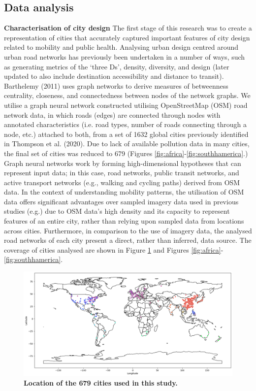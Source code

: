 \documentclass[preprint,12pt]{elsarticle}
\begin{document}
\subsection*{Data analysis}
\textbf{Characterisation of city design}
The first stage of this research was to create a representation of cities that accurately captured important features of city design related to mobility and public health. Analysing urban design centred around urban road networks has previously been undertaken in a number of ways, such as generating metrics of the `three Ds'\cite{Ewing2010}, density, diversity, and design (later updated to also include destination accessibility and distance to transit). Barthelemy (2011)\cite{Barthelemy2011} uses graph networks to derive measures of betweenness centrality, closeness, and connectedness between nodes of the network graphs. We utilise a graph neural network constructed utilising OpenStreetMap (OSM) road network data\cite{Boeing2017a}, in which roads (edges) are connected through nodes with annotated characteristics (i.e. road types, number of roads connecting through a node, etc.) attached to both, from a set of 1632 global cities previously identified in Thompson et al. (2020)\cite{Thompson2020}. Due to lack of available pollution data in many cities, the final set of cities was reduced to 679 (Figures \ref{fig:africa}-\ref{fig:southhamerica}.) Graph neural networks work by forming high-dimensional hypotheses that can represent input data; in this case, road networks, public transit networks, and active transport networks (e.g., walking and cycling paths) derived from OSM data. In the context of understanding mobility patterns, the utilisation of OSM data offers significant advantages over sampled imagery data used in previous studies (e.g.\cite{Thompson2020,seneviratne2021self}) due to OSM data's high density and its capacity to represent features of an entire city, rather than relying upon sampled data from locations across cities. Furthermore, in comparison to the use of imagery data, the analysed road networks of each city present a direct, rather than inferred, data source. The coverage of cities analysed are shown in Figure \ref{fig:clusters} and Figures \ref{fig:africa}-\ref{fig:southhamerica}.


\begin{figure}
\centering
\includegraphics[trim={0 0 0 0},clip,scale=0.4]{Images/ByCountry_map_Zeigler.png}
\caption{\bf Location of the 679 cities used in this study.}
 \label{fig:clusters}
\end{figure}
\end{document}
